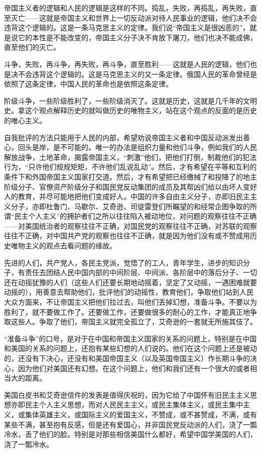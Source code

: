 帝国主义者的逻辑和人民的逻辑是这样的不同。捣乱，失败，再捣乱，再失败，直至灭亡——这就是帝国主义和世界上一切反动派对待人民事业的逻辑，他们决不会违背这个逻辑的。这是一条马克思主义的定律。我们说“帝国主义是很凶恶的”，就是说它的本性是不能改变的，帝国主义分子决不肯放下屠刀，他们也决不能成佛，直至他们的灭亡。

斗争，失败，再斗争，再失败，再斗争，直至胜利——这就是人民的逻辑，他们也是决不会违背这个逻辑的。这是马克思主义的又一条定律。俄国人民的革命曾经是依照了这条定律，中国人民的革命也是依照这条定律。

阶级斗争，一些阶级胜利了，一些阶级消灭了。这就是历史，这就是几千年的文明史。拿这个观点解释历史的就叫做历史的唯物主义，站在这个观点的反面的是历史的唯心主义。

自我批评的方法只能用于人民的内部，希望劝说帝国主义者和中国反动派发出善心，回头是岸，是不可能的。唯一的办法是组织力量和他们斗争，例如我们的人民解放战争，土地革命，揭露帝国主义，“刺激”他们，把他们打倒，制裁他们的犯法行为，“只许他们规规矩矩，不许他们乱说乱动”。然后，才有希望在平等和互利的条件下和外国帝国主义国家打交道。然后，才有希望把已经缴械了和投降了的地主阶级分子、官僚资产阶级分子和国民党反动集团的成员及其帮凶们给以由坏人变好人的教育，并尽可能地把他们变成好人。中国的许多自由主义分子，亦即旧民主主义分子，亦即杜鲁门、马歇尔、艾奇逊、司徒雷登们所瞩望的和经常企图争取的所谓“民主个人主义”的拥护者们之所以往往陷入被动地位，对问题的观察往往不正确——对美国统治者的观察往往不正确，对国民党的观察往往不正确，对苏联的观察往往不正确，对中国共产党的观察也往往不正确，就是因为他们没有或不赞成用历史唯物主义的观点去看问题的缘故。

先进的人们，共产党人，各民主党派，觉悟了的工人，青年学生，进步的知识分子，有责任去团结人民中国内部的中间阶层、中间派、各阶层中的落后分子、一切还在动摇犹豫的人们（这些人们还要长期地动摇着，坚定了又动摇，一遇困难就要动摇的），用善意去帮助他们，批评他们的动摇性，教育他们，争取他们站到人民大众方面来，不让帝国主义把他们拉过去，叫他们丢掉幻想，准备斗争。不要以为胜利了，就不要做工作了。还要做工作，还要做很多的耐心的工作，才能真正地争取这些人。争取了他们，帝国主义就完全孤立了，艾奇逊的一套就无所施其伎了。

“准备斗争”的口号，是对于在中国和帝国主义国家的关系的问题上，特别是在中国和美国的关系的问题上，还抱有某些幻想的人们说的。他们在这个问题上还是被动的，还没有下决心，还没有和美国帝国主义（以及英国帝国主义）作长期斗争的决心，因为他们对美国还有幻想。在这个问题上，他们和我们还有一个很大的或者相当大的距离。

美国白皮书和艾奇逊信件的发表是值得庆祝的，因为它给了中国怀有旧民主主义思想亦即民主个人主义思想，而对人民民主主义，或民主集体主义，或民主集中主义，或集体英雄主义，或国际主义的爱国主义，不赞成，或不甚赞成，不满，或有某些不满，甚至抱有反感，但是还有爱国心，并非国民党反动派的人们，浇了一瓢冷水，丢了他们的脸。特别是对那些相信美国什么都好，希望中国学美国的人们，浇了一瓢冷水。

